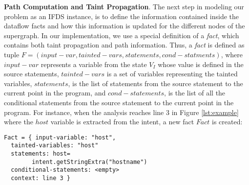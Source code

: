 \noindent
\textbf{Path Computation and Taint Propagation}.
The next step in modeling our problem as an IFDS instance, is to define the information contained inside the dataflow facts and how this information is updated for the different nodes of the supergraph. In our implementation, we use a special definition of a \emph{fact}, which contains both taint propagation and path information. Thus, a \emph{fact} is defined as tuple $F = (input-var, tainted-vars, statements, cond-statments)$, where $input-var$ represents a variable from the state $V_I$ whose value is defined in the source statements, $tainted-vars$ is a set of variables representing the tainted variables, $statements$, is the list of statements from the source statement to the current point in the program, and $cond-statements$, is the list of all the conditional statements from the source statement to the current point in the program. 
For instance, when the analysis reaches line 3 in Figure \ref{lst:example} where the $host$ variable is extracted from the intent, a new fact $Fact$ is created:

\begin{verbatim}
Fact = { input-variable: "host",
  tainted-variables: "host"
  statements: host=
        intent.getStringExtra("hostname")
  conditional-statements: <empty>
  context: line 3 }
\end{verbatim}

